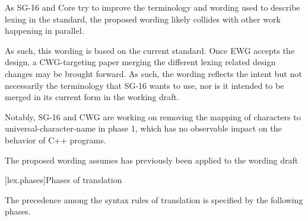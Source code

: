 \documentclass{wg21}
\begin{document}
As SG-16 and Core try to improve the terminology and wording used to describe lexing in the standard,
the proposed wording likely collides with other work happening in parallel.

As such, this wording is based on the current standard.
Once EWG accepts the design, a CWG-targeting paper merging the different lexing related design changes may be brought forward.
As such, the wording reflects the intent but not necessarily the terminology that SG-16 wants to use, nor is it intended to be merged in its current form in the working draft.

Notably, SG-16 and CWG are working on removing the mapping of characters to universal-character-name in phase 1, which has no observable impact on the behavior of C++ programs.

The proposed wording assumes  has previously been applied to the wording draft


[lex.phases]{Phases of translation}%

\pnum
{}%
The precedence among the syntax rules of translation is specified by the
following phases.
\end{document}
